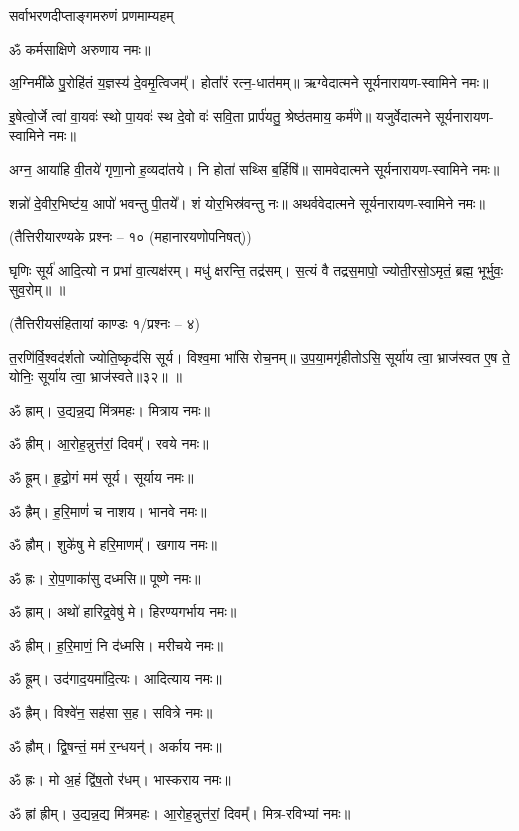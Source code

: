 {सर्वाभरणदीप्ताङ्गमरुणं प्रणमाम्यहम्}

ॐ कर्मसाक्षिणे अरुणाय नमः॥

अ॒ग्निमी᳚ळे पु॒रोहि॑तं य॒ज्ञस्य॑ दे॒वमृ॒त्विजम्᳚। होता᳚रं रत्न॒-धात॑मम्॥ ऋग्वेदात्मने सूर्यनारायण-स्वामिने नमः॥

इ॒षेत्वो॒र्जे त्वा॑ वा॒यवः॑ स्थो पा॒यवः॑ स्थ दे॒वो वः॑ सवि॒ता प्रार्प॑यतु॒ श्रेष्ठ॑तमाय॒ कर्म॑णे॥ यजुर्वेदात्मने सूर्यनारायण-स्वामिने नमः॥

अग्न॒ आया॑हि वी॒तये॑ गृणा॒नो ह॒व्यदा॑तये। नि होता॑ सथ्सि ब॒र्हिषि॑॥ सामवेदात्मने सूर्यनारायण-स्वामिने नमः॥

शन्नो॑ दे॒वीर॒भिष्ट॑य॒ आपो॑ भवन्तु पी॒तये᳚। शं योर॒भिस्र॑वन्तु नः॥ अथर्ववेदात्मने सूर्यनारायण-स्वामिने नमः॥

\centerline{\normalsize (तैत्तिरीयारण्यके प्रश्नः – १० (महानारयणोपनिषत्))}

घृणिः सूर्य॑ आदि॒त्यो न प्रभा॑ वा॒त्यक्ष॑रम्।
मधु॑ क्षरन्ति॒ तद्र॑सम्।
स॒त्यं वै तद्रस॒मापो॒ ज्योती॒रसो॒ऽमृतं॒ ब्रह्म॒ भूर्भुवः॒ सुव॒रोम्॥ \devAya{}॥ %

\centerline{\normalsize (तैत्तिरीयसंहितायां काण्डः १/प्रश्नः – ४)}
त॒रणि॑र्वि॒श्वद॑र्\mbox{}शतो ज्योति॒ष्कृद॑सि सूर्य। विश्व॒मा भा॑सि रोच॒नम्॥ उ॒प॒या॒मगृ॑हीतो\-ऽसि॒ सूर्या॑य त्वा॒ भ्राज॑स्वत ए॒ष ते॒ योनिः॒ सूर्या॑य त्वा॒ भ्राज॑स्वते॥३२॥
\devAya{}॥

ॐ ह्राम्। उ॒द्यन्न॒द्य मि॑त्रमहः। मित्राय नमः॥

ॐ ह्रीम्। आ॒रोह॒न्नुत्त॑रां॒ दिवम्᳚। रवये नमः॥

ॐ ह्रूम्। हृ॒द्रो॒गं मम॑ सूर्य। सूर्याय नमः॥

ॐ ह्रैम्। ह॒रि॒माणं॑ च नाशय। भानवे नमः॥

ॐ ह्रौम्। शुके॑षु मे हरि॒माणम्᳚। खगाय नमः॥

ॐ ह्रः। रो॒प॒णाका॑सु दध्मसि॥ पूष्णे नमः॥

ॐ ह्राम्। अथो॑ हारिद्र॒वेषु॑ मे। हिरण्यगर्भाय नमः॥

ॐ ह्रीम्। ह॒रि॒माणं॒ नि द॑ध्मसि। मरीचये नमः॥

ॐ ह्रूम्। उद॑गाद॒यमा॑दि॒त्यः। आदित्याय नमः॥

ॐ ह्रैम्। विश्वे॑न॒ सह॑सा स॒ह। सवित्रे नमः॥

ॐ ह्रौम्। द्वि॒षन्तं॒ मम॑ र॒न्धयन्॑। अर्काय नमः॥

ॐ ह्रः। मो अ॒हं द्वि॑ष॒तो र॑धम्। भास्कराय नमः॥

ॐ ह्रां ह्रीम्। उ॒द्यन्न॒द्य मि॑त्रमहः। आ॒रोह॒न्नुत्त॑रां॒ दिवम्᳚। मित्र-रविभ्यां नमः॥

